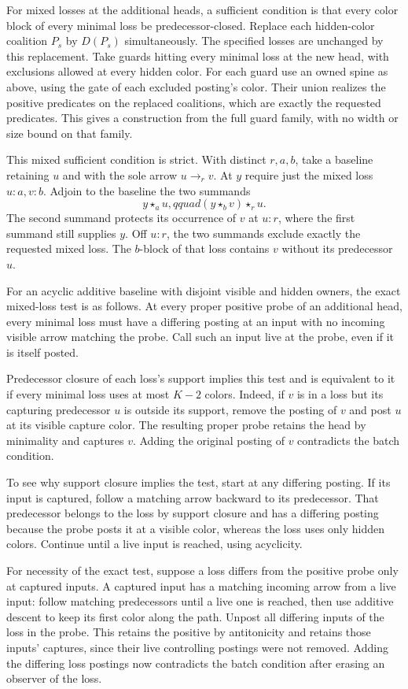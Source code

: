For mixed losses at the additional heads, a
sufficient condition is that every color block
of every minimal loss be predecessor-closed.
Replace each hidden-color coalition $P_s$ by
$D(P_s)$ simultaneously. The specified losses
are unchanged by this replacement. Take guards
hitting every minimal loss at the new head,
with exclusions allowed at every hidden color.
For each guard use an owned spine as above,
using the gate of each excluded posting's color.
Their union realizes the positive predicates
on the replaced coalitions, which are exactly
the requested predicates. This gives a
construction from the full guard family, with
no width or size bound on that family.

This mixed sufficient condition is strict. With
distinct $r,a,b$, take a baseline retaining $u$
and with the sole arrow $u\to_r v$. At $y$
require just the mixed loss $u:a,v:b$. Adjoin
to the baseline the two summands
\[
 y\star_a u,qquad (y\star_b v)\star_r u .
\]
The second summand protects its occurrence of
$v$ at $u:r$, where the first summand still
supplies $y$. Off $u:r$, the two summands
exclude exactly the requested mixed loss.
The $b$-block of that loss contains $v$ without
its predecessor $u$.

For an acyclic additive baseline with disjoint
visible and hidden owners, the exact mixed-loss
test is as follows. At every proper positive
probe of an additional head, every minimal loss
must have a differing posting at an input with
no incoming visible arrow matching the probe.
Call such an input live at the probe, even if
it is itself posted.

Predecessor closure of each loss's support
implies this test and is equivalent to it
if every minimal loss uses at most $K-2$
colors.
Indeed, if $v$ is in a loss but its capturing
predecessor $u$ is outside its support, remove
the posting of $v$ and post $u$ at its visible
capture color. The resulting proper probe
retains the head by minimality and captures
$v$. Adding the original posting of $v$
contradicts the batch condition.

To see why support closure implies the test,
start at any
differing posting. If its input is captured,
follow a matching arrow backward to its
predecessor. That predecessor belongs to the
loss by support closure and has a differing
posting because the probe posts it at a
visible color, whereas the loss uses only
hidden colors. Continue until a live input is
reached, using acyclicity.

For necessity of the exact test, suppose a
loss differs from the positive probe only
at captured inputs. A captured input has
a matching incoming arrow from a live
input: follow matching predecessors until
a live one is reached, then use additive
descent to keep its first color along the
path. Unpost all differing inputs of the
loss in the probe. This retains the positive
by antitonicity and retains those inputs'
captures, since their live controlling
postings were not removed. Adding the
differing loss postings now contradicts
the batch condition after erasing an
observer of the loss.

